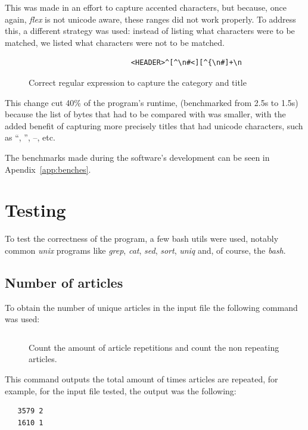 \documentclass[a4paper]{report}
\begin{document}
This was made in an effort to capture accented characters, but because, once
again, \textit{flex} is not unicode aware, these ranges did not work properly.
To address this, a different strategy was used: instead of listing what
characters were to be matched, we listed what characters were not to be
matched.

\begin{figure}[H]
    \centering
    \begin{verbatim}
                        <HEADER>^[^\n#<][^{\n#]+\n
    \end{verbatim}
    \caption{Correct regular expression to capture the category and
    title}\label{fig:new-regex}
\end{figure}

This change cut 40\% of the program's runtime, (benchmarked from 2.5s to 1.5s)
because the list of bytes that had to be compared with was smaller, with the
added benefit of capturing more precisely titles that had unicode characters,
such as  ``,  '', --, etc.

The benchmarks made during the software's development can be seen in
Apendix~\ref{app:benches}.

\chapter{Testing}

To test the correctness of the program, a few bash utils were used, notably
common \textit{unix} programs like \textit{grep}, \textit{cat}, \textit{sed},
\textit{sort}, \textit{uniq} and, of course, the \textit{bash}.

\section{Number of articles}

To obtain the number of unique articles in the input file the following command
was used:
\begin{figure}[H]
    \inputminted{bash}{./test_number_of_articles.sh}
    \caption{Count the amount of article repetitions and count the non repeating
    articles.}
\end{figure}

This command outputs the total amount of times articles are repeated, for
example, for the input file tested, the output was the following:

\begin{verbatim}
   3579 2
   1610 1
\end{verbatim}
\end{document}
